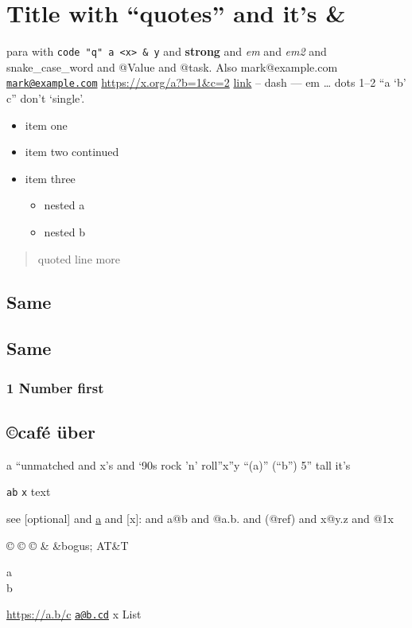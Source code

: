 \section{\texorpdfstring{Title with ``quotes'' and it's \&
}{Title with ``quotes'' and it's \& }}\label{title-with-quotes-and-its}

para with
\texttt{code\ "q"\ \textquotesingle{}a\textquotesingle{}\ \textless{}x\textgreater{}\ \&\ y}
and \textbf{strong} and \emph{em} and \emph{em2} and snake\_case\_word
and @Value and @task. Also mark@example.com
\href{mailto:mark@example.com}{\nolinkurl{mark@example.com}}
\url{https://x.org/a?b=1&c=2} \href{https://e.com/x}{link} -- dash ---
em \ldots{} dots 1--2 ``a `b' c'' don't `single'.

\begin{itemize}
\item
  item one
\item
  item two continued
\item
  item three

  \begin{itemize}
  \tightlist
  \item
    nested a
  \item
    nested b
  \end{itemize}
\end{itemize}

\begin{quote}
quoted line more
\end{quote}

\subsection{Same}\label{same}

\subsection{Same}\label{same-1}

\subsubsection{1 Number first}\label{number-first}

\subsection{©café über}\label{cafuxe9-uxfcber}

a ``unmatched and x's and `90s rock 'n' roll''x''y ``(a)'' (``b'') 5''
tall it's

\texttt{a\textasciigrave{}b} \texttt{x} text

see {[}optional{]} and \href{b}{a} and {[}x{]}: and a@b and @a.b. and
(@ref) and x@y.z and @1x

© © © \& \&bogus; AT\&T

a\\
b

\url{https://a.b/c} \href{mailto:a@b.cd}{\nolinkurl{a@b.cd}} {x} List
